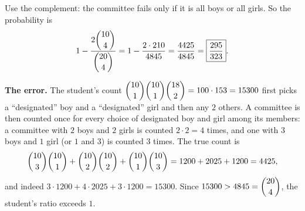 Use the complement: the committee fails only if it is all boys or all girls. So the probability is
\[1-\dfrac{2\dbinom{10}{4}}{\dbinom{20}{4}}=1-\dfrac{2\cdot210}{4845}=\dfrac{4425}{4845}=\boxed{\dfrac{295}{323}} .\]

\textbf{The error.} The student's count $\dbinom{10}1\dbinom{10}1\dbinom{18}2=100\cdot153=15300$ first picks a ``designated'' boy and a ``designated'' girl and then any $2$ others. A committee is then counted once for every choice of designated boy and girl among its members: a committee with $2$ boys and $2$ girls is counted $2\cdot2=4$ times, and one with $3$ boys and $1$ girl (or $1$ and $3$) is counted $3$ times. The true count is
\[\dbinom{10}{3}\dbinom{10}{1}+\dbinom{10}{2}\dbinom{10}{2}+\dbinom{10}{1}\dbinom{10}{3}=1200+2025+1200=4425,\]
and indeed $3\cdot1200+4\cdot2025+3\cdot1200=15300$. Since $15300>4845=\dbinom{20}{4}$, the student's ratio exceeds $1$.
